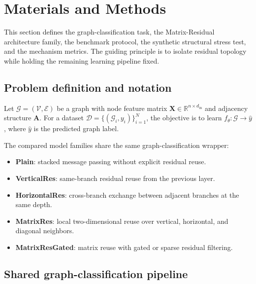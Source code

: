 \section{Materials and Methods}
\label{sec:methods}

This section defines the graph-classification task, the Matrix-Residual architecture family, the benchmark protocol, the synthetic structural stress test, and the mechanism metrics. The guiding principle is to isolate residual topology while holding the remaining learning pipeline fixed.

\subsection{Problem definition and notation}

Let \(\mathcal{G}=(\mathcal{V},\mathcal{E})\) be a graph with node feature matrix \(\mathbf{X}\in\mathbb{R}^{n\times d_{\mathrm{in}}}\) and adjacency structure \(\mathbf{A}\). For a dataset \(\mathcal{D}=\{(\mathcal{G}_i,y_i)\}_{i=1}^{N}\), the objective is to learn \(f_{\theta}:\mathcal{G}\rightarrow \hat{y}\), where \(\hat{y}\) is the predicted graph label.

The compared model families share the same graph-classification wrapper:
\begin{itemize}
    \item \textbf{Plain}: stacked message passing without explicit residual reuse.
    \item \textbf{VerticalRes}: same-branch residual reuse from the previous layer.
    \item \textbf{HorizontalRes}: cross-branch exchange between adjacent branches at the same depth.
    \item \textbf{MatrixRes}: local two-dimensional reuse over vertical, horizontal, and diagonal neighbors.
    \item \textbf{MatrixResGated}: matrix reuse with gated or sparse residual filtering.
\end{itemize}

\subsection{Shared graph-classification pipeline}

